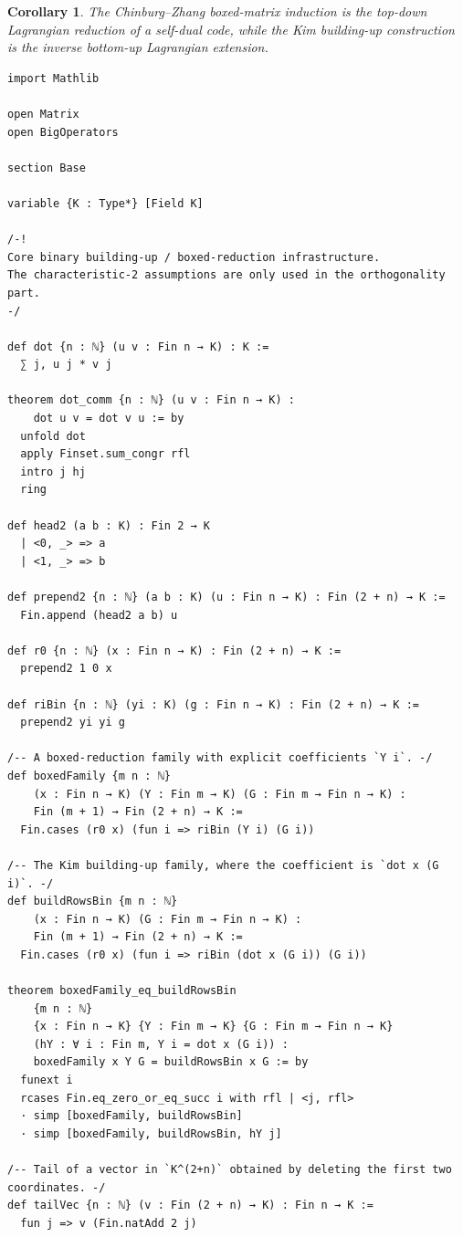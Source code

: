 \documentclass[12pt]{article}
\newtheorem{cor}[theorem]{Corollary}
\begin{document}
\begin{cor}
The Chinburg--Zhang boxed-matrix induction is the top-down Lagrangian reduction of a self-dual code, while the Kim building-up construction is the inverse bottom-up Lagrangian extension.
\end{cor}

\begin{lstlisting}[caption={Lean verification for Theorem~\ref{thm:CZ_Kim_Lagrangian}.}]
import Mathlib

open Matrix
open BigOperators

section Base

variable {K : Type*} [Field K]

/-!
Core binary building-up / boxed-reduction infrastructure.
The characteristic-2 assumptions are only used in the orthogonality part.
-/

def dot {n : ℕ} (u v : Fin n → K) : K :=
  ∑ j, u j * v j

theorem dot_comm {n : ℕ} (u v : Fin n → K) :
    dot u v = dot v u := by
  unfold dot
  apply Finset.sum_congr rfl
  intro j hj
  ring

def head2 (a b : K) : Fin 2 → K
  | <0, _> => a
  | <1, _> => b

def prepend2 {n : ℕ} (a b : K) (u : Fin n → K) : Fin (2 + n) → K :=
  Fin.append (head2 a b) u

def r0 {n : ℕ} (x : Fin n → K) : Fin (2 + n) → K :=
  prepend2 1 0 x

def riBin {n : ℕ} (yi : K) (g : Fin n → K) : Fin (2 + n) → K :=
  prepend2 yi yi g

/-- A boxed-reduction family with explicit coefficients `Y i`. -/
def boxedFamily {m n : ℕ}
    (x : Fin n → K) (Y : Fin m → K) (G : Fin m → Fin n → K) :
    Fin (m + 1) → Fin (2 + n) → K :=
  Fin.cases (r0 x) (fun i => riBin (Y i) (G i))

/-- The Kim building-up family, where the coefficient is `dot x (G i)`. -/
def buildRowsBin {m n : ℕ}
    (x : Fin n → K) (G : Fin m → Fin n → K) :
    Fin (m + 1) → Fin (2 + n) → K :=
  Fin.cases (r0 x) (fun i => riBin (dot x (G i)) (G i))

theorem boxedFamily_eq_buildRowsBin
    {m n : ℕ}
    {x : Fin n → K} {Y : Fin m → K} {G : Fin m → Fin n → K}
    (hY : ∀ i : Fin m, Y i = dot x (G i)) :
    boxedFamily x Y G = buildRowsBin x G := by
  funext i
  rcases Fin.eq_zero_or_eq_succ i with rfl | <j, rfl>
  · simp [boxedFamily, buildRowsBin]
  · simp [boxedFamily, buildRowsBin, hY j]

/-- Tail of a vector in `K^(2+n)` obtained by deleting the first two coordinates. -/
def tailVec {n : ℕ} (v : Fin (2 + n) → K) : Fin n → K :=
  fun j => v (Fin.natAdd 2 j)


\end{lstlisting}
\end{document}
